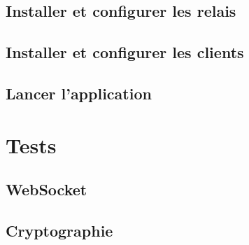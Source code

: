 \documentclass[a4paper,12pt]{report}
\begin{document}
	\subsection{Installer et configurer les relais}
	
	\subsection{Installer et configurer les clients}

	\subsection{Lancer l'application}
	
\newpage	
\section{Tests}
	\subsection{WebSocket}
	
	\subsection{Cryptographie}
\end{document}
